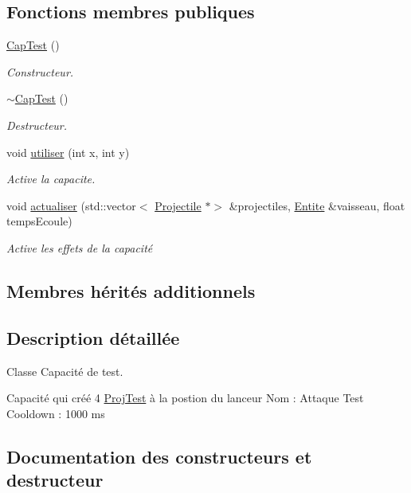 \subsection*{Fonctions membres publiques}
\begin{DoxyCompactItemize}
\item 
\hyperlink{class_cap_test_a5f6d4b172a6a40f974b3f7414e3f06e5}{Cap\+Test} ()
\begin{DoxyCompactList}\small\item\em Constructeur. \end{DoxyCompactList}\item 
\hyperlink{class_cap_test_a92687aa212347d1738e7736cb107d03b}{$\sim$\+Cap\+Test} ()
\begin{DoxyCompactList}\small\item\em Destructeur. \end{DoxyCompactList}\item 
void \hyperlink{class_cap_test_a9c85a17dec6cf78f1438b08b175f650d}{utiliser} (int x, int y)
\begin{DoxyCompactList}\small\item\em Active la capacite. \end{DoxyCompactList}\item 
void \hyperlink{class_cap_test_a082e76e397a400b9c46e13e63ac7ef85}{actualiser} (std\+::vector$<$ \hyperlink{class_projectile}{Projectile} $\ast$$>$ \&projectiles, \hyperlink{class_entite}{Entite} \&vaisseau, float temps\+Ecoule)
\begin{DoxyCompactList}\small\item\em Active les effets de la capacité \end{DoxyCompactList}\end{DoxyCompactItemize}
\subsection*{Membres hérités additionnels}


\subsection{Description détaillée}
Classe Capacité de test. 

Capacité qui créé 4 \hyperlink{class_proj_test}{Proj\+Test} à la postion du lanceur Nom \+: Attaque Test Cooldown \+: 1000 ms 

\subsection{Documentation des constructeurs et destructeur}
\mbox{\label{class_cap_test_a5f6d4b172a6a40f974b3f7414e3f06e5}} 
